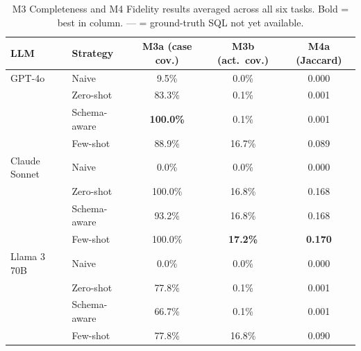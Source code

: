 \begin{table}[t]
  \caption{M3 Completeness and M4 Fidelity results averaged across all six tasks. Bold = best in column. --- = ground-truth SQL not yet available.}\label{tab:m3m4}
  \centering
  \begin{tabular}{@{}llccc@{}}
    \toprule
    \textbf{LLM} & \textbf{Strategy} & \textbf{M3a (case cov.)} & \textbf{M3b (act.~cov.)} & \textbf{M4a (Jaccard)} \\
    \midrule
    GPT-4o & Naive & \cellcolor{red!20}9.5\% & \cellcolor{red!20}0.0\% & \cellcolor{red!20}0.000 \\
     & Zero-shot & \cellcolor{green!20}83.3\% & \cellcolor{red!20}0.1\% & \cellcolor{red!20}0.001 \\
     & Schema-aware & \cellcolor{green!20}\textbf{100.0\%} & \cellcolor{red!20}0.1\% & \cellcolor{red!20}0.001 \\
     & Few-shot & \cellcolor{green!20}88.9\% & \cellcolor{red!20}16.7\% & \cellcolor{red!20}0.089 \\
    \midrule
    Claude Sonnet & Naive & \cellcolor{red!20}0.0\% & \cellcolor{red!20}0.0\% & \cellcolor{red!20}0.000 \\
     & Zero-shot & \cellcolor{green!20}100.0\% & \cellcolor{red!20}16.8\% & \cellcolor{red!20}0.168 \\
     & Schema-aware & \cellcolor{green!20}93.2\% & \cellcolor{red!20}16.8\% & \cellcolor{red!20}0.168 \\
     & Few-shot & \cellcolor{green!20}100.0\% & \cellcolor{red!20}\textbf{17.2\%} & \cellcolor{red!20}\textbf{0.170} \\
    \midrule
    Llama 3 70B & Naive & \cellcolor{red!20}0.0\% & \cellcolor{red!20}0.0\% & \cellcolor{red!20}0.000 \\
     & Zero-shot & \cellcolor{green!20}77.8\% & \cellcolor{red!20}0.1\% & \cellcolor{red!20}0.001 \\
     & Schema-aware & \cellcolor{green!20}66.7\% & \cellcolor{red!20}0.1\% & \cellcolor{red!20}0.001 \\
     & Few-shot & \cellcolor{green!20}77.8\% & \cellcolor{red!20}16.8\% & \cellcolor{red!20}0.090 \\
    \midrule
    \bottomrule
  \end{tabular}
\end{table}

